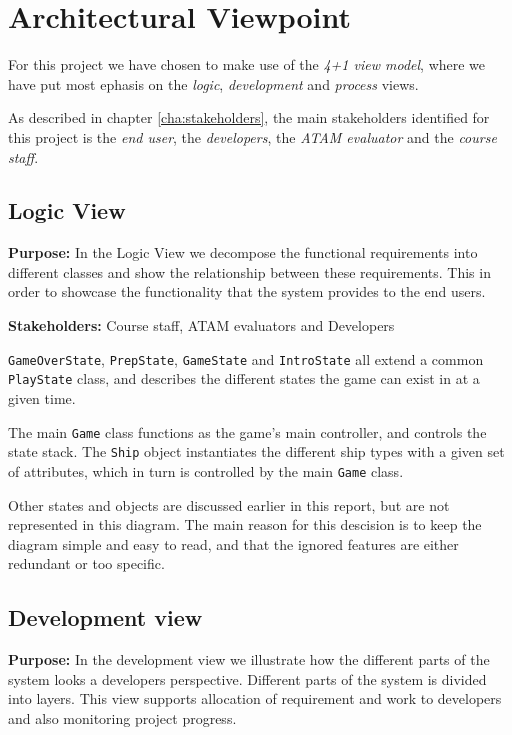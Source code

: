\chapter{Architectural Viewpoint}
\label{cha:architectural_viewpoint}
For this project we have chosen to make use of the \emph{4+1 view model}, where we have put most ephasis on the \emph{logic}, \emph{development} and \emph{process} views.


As described in chapter \ref{cha:stakeholders}, the main stakeholders identified for this project is the \emph{end user}, the \emph{developers}, the \emph{ATAM evaluator} and the \emph{course staff}.




    \section{Logic View}
    \textbf{Purpose:} In the Logic View we decompose the functional requirements into different classes and show the relationship between these requirements. This in order to showcase the functionality that the system provides to the end users.

    
    
    \noindent\textbf{Stakeholders:} Course staff, ATAM evaluators and Developers 
    
    

    \texttt{GameOverState}, \texttt{PrepState}, \texttt{GameState} and \texttt{IntroState} all extend a common \texttt{PlayState} class, and describes the different states the game can exist in at a given time.

    The main \texttt{Game} class functions as the game's main controller, and controls the state stack. The \texttt{Ship} object instantiates the different ship types with a given set of attributes, which in turn is controlled by the main \texttt{Game} class.

    Other states and objects are discussed earlier in this report, but are not represented in this diagram. The main reason for this descision is to keep the diagram simple and easy to read, and that the ignored features are either redundant or too specific.



    \section{Development view}
    \textbf{Purpose:} In the development view we illustrate how the different parts of the system looks a developers perspective. Different parts of the system is divided into layers. This view supports allocation of requirement and work to developers and also monitoring project progress.  
    
